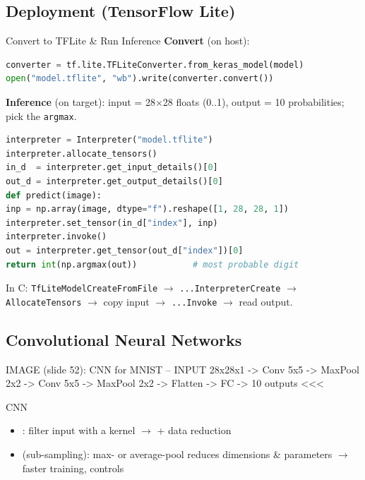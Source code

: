 \subsection{Deployment (TensorFlow Lite)}

\begin{KR}{Convert to TFLite \& Run Inference}
    \textbf{Convert} (on host):
\begin{lstlisting}[language=Python, style=basesmol, aboveskip=2pt, belowskip=2pt]
converter = tf.lite.TFLiteConverter.from_keras_model(model)
open("model.tflite", "wb").write(converter.convert())
\end{lstlisting}
    \textbf{Inference} (on target): input = 28$\times$28 floats (0..1), output = 10
    probabilities; pick the \texttt{argmax}.
\begin{lstlisting}[language=Python, style=basesmol, aboveskip=2pt, belowskip=2pt]
interpreter = Interpreter("model.tflite")
interpreter.allocate_tensors()
in_d  = interpreter.get_input_details()[0]
out_d = interpreter.get_output_details()[0]
def predict(image):
inp = np.array(image, dtype="f").reshape([1, 28, 28, 1])
interpreter.set_tensor(in_d["index"], inp)
interpreter.invoke()
out = interpreter.get_tensor(out_d["index"])[0]
return int(np.argmax(out))           # most probable digit
\end{lstlisting}
    In C: \texttt{TfLiteModelCreateFromFile} $\to$ \texttt{...InterpreterCreate} $\to$
    \texttt{AllocateTensors} $\to$ copy input $\to$ \texttt{...Invoke} $\to$ read output.
\end{KR}

\raggedcolumns
\columnbreak

\subsection{Convolutional Neural Networks}

IMAGE (slide 52): CNN for MNIST -- INPUT 28x28x1 -> Conv 5x5 -> MaxPool 2x2 -> Conv 5x5 -> MaxPool 2x2 -> Flatten -> FC -> 10 outputs <<<


\begin{concept}{CNN}
    \begin{itemize}
        \item {}: filter input with a kernel $\to$
               + data reduction
        \item {} (sub-sampling): max- or average-pool reduces
              dimensions \& parameters $\to$ faster training, controls
    \end{itemize}
\end{concept}

